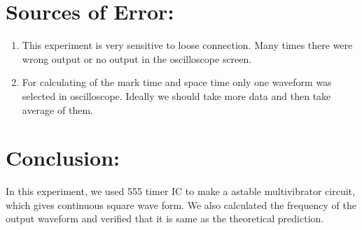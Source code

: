 \documentclass{scrartcl}
\begin{document}
\section{Sources of Error:}
\begin{enumerate}
	\item This experiment is very sensitive to loose connection. Many times there were wrong output or no output in the oscilloscope screen.
	\item For calculating of the mark time and space time only one waveform was selected in oscilloscope. Ideally we should take more data and then take average of them.
\end{enumerate}

\section{Conclusion:}
In this experiment, we used 555 timer IC to make a astable multivibrator circuit, which gives continuous square wave form. We also calculated the frequency of the output waveform and verified that it is same as the theoretical prediction.
\end{document}
